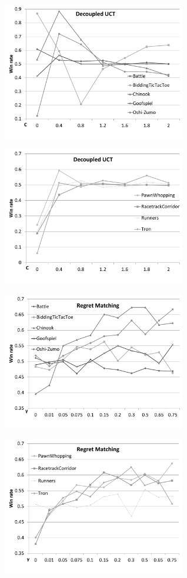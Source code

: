 \begin{figure}[h!]
\centering
\begin{subfigure}{9cm}
\includegraphics[width=8.0cm]{figures/duct1}\\
\end{subfigure}
\begin{subfigure}{9cm}
\includegraphics[width=8.0cm]{figures/duct2}\\
\end{subfigure}
\begin{subfigure}{9cm}
\includegraphics[width=8.0cm]{figures/regretmatching1}\\
\end{subfigure}
\begin{subfigure}{9cm}
\includegraphics[width=8.0cm]{figures/regretmatching2}\\

\end{subfigure}
\end{figure}
